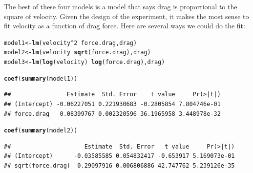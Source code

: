 \documentclass[twoside]{book}\usepackage[]{graphicx}\usepackage[]{xcolor}
\makeatletter
\newcommand{\hlnum}[1]{\textcolor[rgb]{0.686,0.059,0.569}{#1}}%
\newcommand{\hlopt}[1]{\textcolor[rgb]{0,0,0}{#1}}%
\newcommand{\hlstd}[1]{\textcolor[rgb]{0.345,0.345,0.345}{#1}}%
\newcommand{\hlkwb}[1]{\textcolor[rgb]{0.69,0.353,0.396}{#1}}%
\newcommand{\hlkwd}[1]{\textcolor[rgb]{0.737,0.353,0.396}{\textbf{#1}}}%
\newenvironment{kframe}{%
 \def\at@end@of@kframe{}%
 \ifinner\ifhmode%
  \def\at@end@of@kframe{\end{minipage}}%
  \begin{minipage}{\columnwidth}%
 \fi\fi%
 \def\FrameCommand##1{\hskip\@totalleftmargin \hskip-\fboxsep
 \colorbox{shadecolor}{##1}\hskip-\fboxsep
     \hskip-\linewidth \hskip-\@totalleftmargin \hskip\columnwidth}%
 \MakeFramed {\advance\hsize-\width
   \@totalleftmargin\z@ \linewidth\hsize
   \@setminipage}}%
 {\par\unskip\endMakeFramed%
 \at@end@of@kframe}
\newenvironment{knitrout}{}{} %
\makeatother
\begin{document}
\begin{solution}
The best of these four models is a model that says drag is proportional
to the square of velocity.
Given the design of the experiment, it makes the most sense to fit
velocity as a function of drag force.  Here are several ways we could 
do the fit:
\begin{knitrout}
\color{fgcolor}\begin{kframe}
\begin{alltt}
\hlstd{model1} \hlkwb{<-} \hlkwd{lm}\hlstd{(velocity}\hlopt{^}\hlnum{2} \hlopt{~} \hlstd{force.drag, drag)}
\hlstd{model2} \hlkwb{<-} \hlkwd{lm}\hlstd{(velocity} \hlopt{~} \hlkwd{sqrt}\hlstd{(force.drag), drag)}
\hlstd{model3} \hlkwb{<-} \hlkwd{lm}\hlstd{(}\hlkwd{log}\hlstd{(velocity)} \hlopt{~} \hlkwd{log}\hlstd{(force.drag), drag)}
\end{alltt}
\end{kframe}
\end{knitrout}
\begin{knitrout}
\color{fgcolor}\begin{kframe}
\begin{alltt}
\hlkwd{coef}\hlstd{(}\hlkwd{summary}\hlstd{(model1))}
\end{alltt}
\begin{verbatim}
##                Estimate  Std. Error    t value     Pr(>|t|)
## (Intercept) -0.06227051 0.221930683 -0.2805854 7.804746e-01
## force.drag   0.08399767 0.002320596 36.1965958 3.448978e-32
\end{verbatim}
\end{kframe}
\end{knitrout}
\begin{knitrout}
\color{fgcolor}\begin{kframe}
\begin{alltt}
\hlkwd{coef}\hlstd{(}\hlkwd{summary}\hlstd{(model2))}
\end{alltt}
\begin{verbatim}
##                     Estimate  Std. Error   t value     Pr(>|t|)
## (Intercept)      -0.03585585 0.054832417 -0.653917 5.169073e-01
## sqrt(force.drag)  0.29097916 0.006806886 42.747762 5.239126e-35
\end{verbatim}
\end{kframe}
\end{knitrout}
\begin{knitrout}
\color{fgcolor}\begin{kframe}

\end{kframe}
\end{knitrout}
\end{solution}
\end{document}
